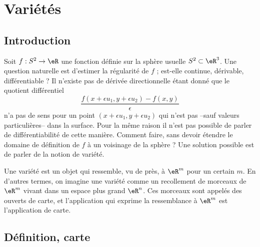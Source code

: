 
\section{Variétés}

\subsection{Introduction}
Soit \( f : S^2 \to \eR\) une fonction définie sur la sphère usuelle
\( S^2 \subset \eR^3\). Une question naturelle est d'estimer la
régularité de \( f\) ; est-elle continue, dérivable, différentiable ? Il
n'existe pas de dérivée directionnelle étant donné que le quotient
différentiel
\begin{equation*}
	\frac{f(x + \epsilon u_1 ,y + \epsilon u_2) - f(x,y)}{\epsilon}
\end{equation*}
n'a pas de sens pour un point \( (x + \epsilon u_1 ,y + \epsilon u_2)\)
qui n'est pas --sauf valeurs particulières-- dans la surface. Pour la
même raison il n'est pas possible de parler de différentiabilité de
cette manière. Comment faire, sans devoir étendre le domaine de
définition de \( f\) à un voisinage de la sphère ? Une solution possible
est de parler de la notion de variété.

Une variété est un objet qui ressemble, vu de près, à \( \eR^m\) pour un
certain \( m\). En d'autres termes, on imagine une variété comme un
recollement de morceaux de \( \eR^m\) vivant dans un espace plus grand
\( \eR^n\). Ces morceaux sont appelés des ouverts de carte, et
l'application qui exprime la ressemblance à \( \eR^m\) est l'application
de carte.

\subsection{Définition, carte}

